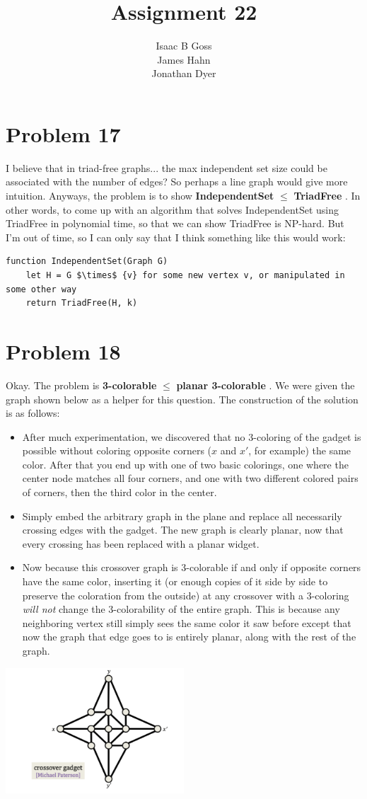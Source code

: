 \documentclass{article}
\author{Isaac B Goss\\ James Hahn\\ Jonathan Dyer}
\title{Assignment 22}
\providecommand{\prob}[1]{\section*{Problem #1}}
\providecommand{\reducible}[2]{
  \textbf{#1} $\leq$ \textbf{#2}
}
\begin{document}
\maketitle
\prob{17}
I believe that in triad-free graphs... the max independent set size could be associated with the number of edges? So perhaps a line graph would give more intuition. Anyways, the problem is to show \reducible{IndependentSet}{TriadFree}. In other words, to come up with an algorithm that solves IndependentSet using TriadFree in polynomial time, so that we can show TriadFree is NP-hard. But I'm out of time, so I can only say that I think something like this would work:
\begin{lstlisting}
function IndependentSet(Graph G)
    let H = G $\times$ {v} for some new vertex v, or manipulated in some other way
    return TriadFree(H, k)
\end{lstlisting}



\prob{18}
Okay. The problem is \reducible{3-colorable}{planar 3-colorable}. We were given the graph shown below as a helper for this question. The construction of the solution is as follows:\\
\begin{itemize}
    \item After much experimentation, we discovered that no 3-coloring of the gadget is possible without coloring opposite corners ($x$ and $x'$, for example) the same color. After that you end up with one of two basic colorings, one where the center node matches all four corners, and one with two different colored pairs of corners, then the third color in the center.
    \item Simply embed the arbitrary graph in the plane and replace all necessarily crossing edges with the gadget. The new graph is clearly planar, now that every crossing has been replaced with a planar widget.
    \item Now because this crossover graph is 3-colorable if and only if opposite corners have the same color, inserting it  (or enough copies of it side by side to preserve the coloration from the outside) at any crossover with a 3-coloring \textit{will not} change the 3-colorability of the entire graph. This is because any neighboring vertex still simply sees the same color it saw before except that now the graph that edge goes to is entirely planar, along with the rest of the graph.
\end{itemize}

\begin{center}
    \includegraphics[width=0.5\textwidth]
        {gadget}
\end{center}
\end{document}
